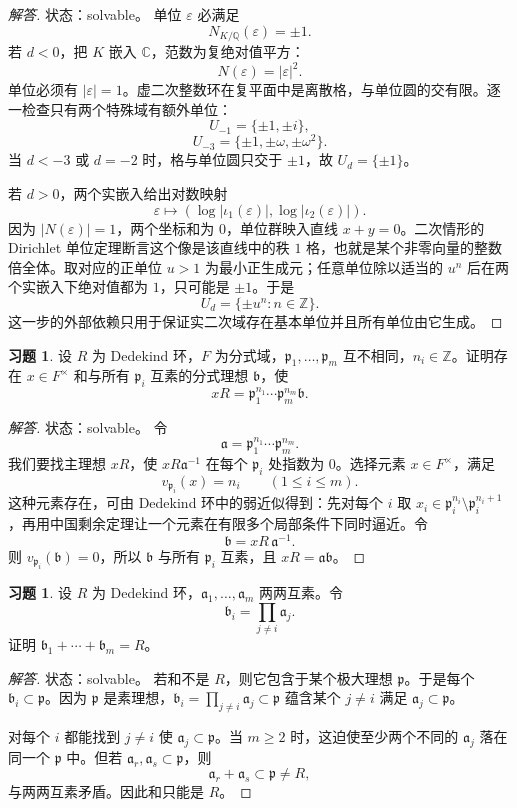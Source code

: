 \documentclass[11pt,a4paper,openany]{ctexbook}
\numberwithin{equation}{chapter}
\newcommand{\Q}{\mathbb{Q}}
\newcommand{\C}{\mathbb{C}}
\newcommand{\Z}{\mathbb{Z}}
\theoremstyle{plain}
\theoremstyle{definition}
\newtheorem{exercise}[theorem]{习题}
\theoremstyle{remark}
\begin{document}
\begin{proof}[解答]
状态：solvable。
单位 $\varepsilon$ 必满足
\[
N_{K/\Q}(\varepsilon)=\pm1.
\]
若 $d<0$，把 $K$ 嵌入 $\C$，范数为复绝对值平方：
\[
N(\varepsilon)=|\varepsilon|^2.
\]
单位必须有 $|\varepsilon|=1$。虚二次整数环在复平面中是离散格，与单位圆的交有限。逐一检查只有两个特殊域有额外单位：
\[
U_{-1}=\{\pm1,\pm i\},
\]
\[
U_{-3}=\{\pm1,\pm\omega,\pm\omega^2\}.
\]
当 $d<-3$ 或 $d=-2$ 时，格与单位圆只交于 $\pm1$，故 $U_d=\{\pm1\}$。

若 $d>0$，两个实嵌入给出对数映射
\[
\varepsilon\mapsto(\log|\iota_1(\varepsilon)|,\log|\iota_2(\varepsilon)|).
\]
因为 $|N(\varepsilon)|=1$，两个坐标和为 $0$，单位群映入直线 $x+y=0$。二次情形的 Dirichlet 单位定理断言这个像是该直线中的秩 $1$ 格，也就是某个非零向量的整数倍全体。取对应的正单位 $u>1$ 为最小正生成元；任意单位除以适当的 $u^n$ 后在两个实嵌入下绝对值都为 $1$，只可能是 $\pm1$。于是
\[
U_d=\{\pm u^n:n\in\Z\}.
\]
这一步的外部依赖只用于保证实二次域存在基本单位并且所有单位由它生成。
\end{proof}

\begin{exercise}
设 $R$ 为 Dedekind 环，$F$ 为分式域，$\mathfrak p_1,\dots,\mathfrak p_m$ 互不相同，$n_i\in\Z$。证明存在 $x\in F^\times$ 和与所有 $\mathfrak p_i$ 互素的分式理想 $\mathfrak b$，使
\[
xR=\mathfrak p_1^{n_1}\cdots\mathfrak p_m^{n_m}\mathfrak b.
\]
\end{exercise}

\begin{proof}[解答]
状态：solvable。
令
\[
\mathfrak a=\mathfrak p_1^{n_1}\cdots\mathfrak p_m^{n_m}.
\]
我们要找主理想 $xR$，使 $xR\mathfrak a^{-1}$ 在每个 $\mathfrak p_i$ 处指数为 $0$。选择元素 $x\in F^\times$，满足
\[
v_{\mathfrak p_i}(x)=n_i\qquad(1\le i\le m).
\]
这种元素存在，可由 Dedekind 环中的弱近似得到：先对每个 $i$ 取 $x_i\in\mathfrak p_i^{n_i}\setminus\mathfrak p_i^{n_i+1}$，再用中国剩余定理让一个元素在有限多个局部条件下同时逼近。令
\[
\mathfrak b=xR\,\mathfrak a^{-1}.
\]
则 $v_{\mathfrak p_i}(\mathfrak b)=0$，所以 $\mathfrak b$ 与所有 $\mathfrak p_i$ 互素，且 $xR=\mathfrak a\mathfrak b$。
\end{proof}

\begin{exercise}
设 $R$ 为 Dedekind 环，$\mathfrak a_1,\dots,\mathfrak a_m$ 两两互素。令
\[
\mathfrak b_i=\prod_{j\ne i}\mathfrak a_j.
\]
证明 $\mathfrak b_1+\cdots+\mathfrak b_m=R$。
\end{exercise}

\begin{proof}[解答]
状态：solvable。
若和不是 $R$，则它包含于某个极大理想 $\mathfrak p$。于是每个 $\mathfrak b_i\subset\mathfrak p$。因为 $\mathfrak p$ 是素理想，$\mathfrak b_i=\prod_{j\ne i}\mathfrak a_j\subset\mathfrak p$ 蕴含某个 $j\ne i$ 满足 $\mathfrak a_j\subset\mathfrak p$。

对每个 $i$ 都能找到 $j\ne i$ 使 $\mathfrak a_j\subset\mathfrak p$。当 $m\ge2$ 时，这迫使至少两个不同的 $\mathfrak a_j$ 落在同一个 $\mathfrak p$ 中。但若 $\mathfrak a_r,\mathfrak a_s\subset\mathfrak p$，则
\[
\mathfrak a_r+\mathfrak a_s\subset\mathfrak p\ne R,
\]
与两两互素矛盾。因此和只能是 $R$。
\end{proof}
\end{document}
